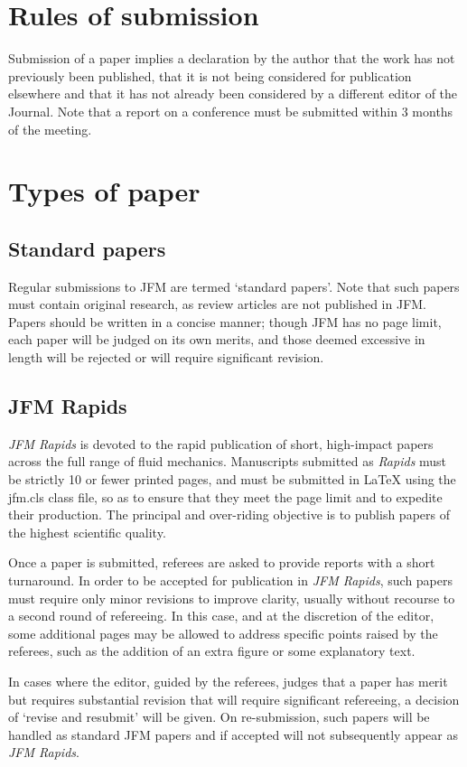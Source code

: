 \documentclass{jfm}
\begin{document}
\section{Rules of submission}\label{sec:rules_submission}
Submission of a paper implies a declaration by the author that the work has not previously been published, that it is not being considered for publication elsewhere and that it has not already been considered by a different editor of the Journal. Note that a report on a conference must be submitted within 3 months of the meeting.

\section{Types of paper}\label{sec:types_paper}
\subsection{Standard papers}
Regular submissions to JFM are termed `standard papers'. Note that such papers must contain original research, as review articles are not published in JFM. Papers should be written in a concise manner; though JFM has no page limit, each paper will be judged on its own merits, and those deemed excessive in length will be rejected or will require significant revision.  
\subsection{JFM Rapids}
{\it JFM Rapids} is devoted to the rapid publication of short, high-impact papers across the full range of fluid mechanics. Manuscripts submitted as {\it Rapids}  must be strictly 10 or fewer printed pages, and must be submitted in {\LaTeX} using the jfm.cls class file, so as to ensure that they meet the page limit and to expedite their production.  The principal and over-riding objective is to publish papers of the highest scientific quality. 

Once a paper is submitted, referees are asked to provide reports with a short turnaround.  In order to be accepted for publication in {\it JFM Rapids}, such papers must require only minor revisions to improve clarity, usually without recourse to a second round of refereeing. In this case, and at the discretion of the editor, some additional pages may be allowed to address specific points raised by the referees, such as the addition of an extra figure or some explanatory text.  

In cases where the editor, guided by the referees, judges that a paper has merit but requires substantial revision that will require significant refereeing, a decision of `revise and resubmit' will be given. On re-submission, such papers will be handled as standard JFM papers and if accepted will not subsequently appear as {\it JFM Rapids}.
\end{document}
